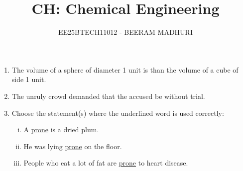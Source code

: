\documentclass[journal,12pt,onecolumn]{IEEEtran}
\theoremstyle{remark}
\begin{document}
\title{CH: Chemical Engineering}
\author{EE25BTECH11012 - BEERAM MADHURI}
\maketitle
\renewcommand{\thefigure}{\theenumi}
\renewcommand{\thetable}{\theenumi}

\begin{enumerate}

\section*{Q. 1--Q. 5 carry one mark each.}

\item The volume of a sphere of diameter 1 unit is\underline {\hspace{1cm}} than the volume of a cube of side 1 unit.
 \hfill{}
\begin{enumerate}
\end{enumerate}

\item The unruly crowd demanded that the accused be \underline{\hspace{1cm}} without trial.
 \hfill{}
\begin{enumerate}
\end{enumerate}

\item Choose the statement(s) where the underlined word is used correctly:
\begin{enumerate}[(i)]
    \item A \underline{prone} is a dried plum.
    \item He was lying \underline{prone} on the floor.
    \item People who eat a lot of fat are \underline{prone} to heart disease.
\end{enumerate}
 \hfill{}
\begin{enumerate}
\end{enumerate}


\end{enumerate}
\end{document}
